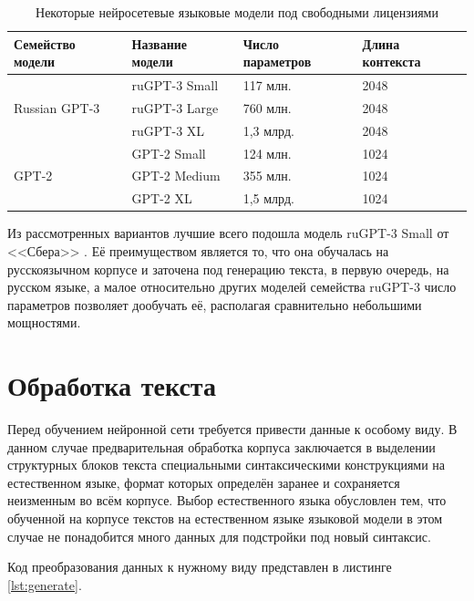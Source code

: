 \begin{table}[]
\caption{Некоторые нейросетевые языковые модели под свободными лицензиями}
\begin{tabular}{|l|l|l|l|}
\hline
Семейство модели               & Название модели & Число параметров & Длина контекста \\ \hline
\multirow{3}{*}{Russian GPT-3} & ruGPT-3 Small   & 117 млн.         & 2048            \\ \cline{2-4} 
                                & ruGPT-3 Large   & 760 млн.         & 2048            \\ \cline{2-4} 
                                & ruGPT-3 XL      & 1,3 млрд.        & 2048            \\ \hline
\multirow{3}{*}{GPT-2}         & GPT-2 Small     & 124 млн.         & 1024            \\ \cline{2-4} 
                                & GPT-2 Medium    & 355 млн.         & 1024            \\ \cline{2-4} 
                                & GPT-2 XL        & 1,5 млрд.        & 1024            \\ \hline
\end{tabular}
\label{tab:models}
\end{table}

Из рассмотренных вариантов лучшие всего подошла модель ruGPT-3 Small от <<Сбера>> \cite{art:sber_pr}. Её преимуществом является то, что она обучалась на русскоязычном корпусе и заточена под генерацию текста, в первую очередь, на русском языке, а малое относительно других моделей семейства ruGPT-3 число параметров позволяет дообучать её, располагая сравнительно небольшими мощностями.

\section{Обработка текста}

Перед обучением нейронной сети требуется привести данные к особому виду. В данном случае предварительная обработка корпуса заключается в выделении структурных блоков текста специальными синтаксическими конструкциями на естественном языке, формат которых определён заранее и сохраняется неизменным во всём корпусе. Выбор естественного языка обусловлен тем, что обученной на корпусе текстов на естественном языке языковой модели в этом случае не понадобится много данных для подстройки под новый синтаксис.

Код преобразования данных к нужному виду представлен в листинге \ref*{lst:generate}.

